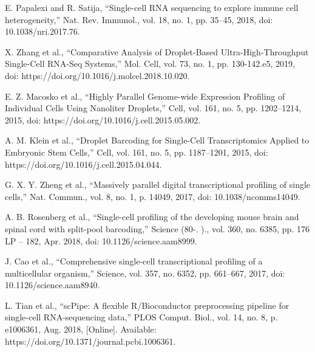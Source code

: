 \documentclass[10pt,journal,compsoc]{IEEEtran}
\begin{document}
%
%
\begin{thebibliography}{1}
	

%
%

E. Papalexi and R. Satija, “Single-cell RNA sequencing to explore immune cell heterogeneity,” Nat. Rev. Immunol., vol. 18, no. 1, pp. 35–45, 2018, doi: 10.1038/nri.2017.76.

X. Zhang et al., “Comparative Analysis of Droplet-Based Ultra-High-Throughput Single-Cell RNA-Seq Systems,” Mol. Cell, vol. 73, no. 1, pp. 130-142.e5, 2019, doi: https://doi.org/10.1016/j.molcel.2018.10.020.

E. Z. Macosko et al., “Highly Parallel Genome-wide Expression Profiling of Individual Cells Using Nanoliter Droplets,” Cell, vol. 161, no. 5, pp. 1202–1214, 2015, doi: https://doi.org/10.1016/j.cell.2015.05.002.

A. M. Klein et al., “Droplet Barcoding for Single-Cell Transcriptomics Applied to Embryonic Stem Cells,” Cell, vol. 161, no. 5, pp. 1187–1201, 2015, doi: https://doi.org/10.1016/j.cell.2015.04.044.

G. X. Y. Zheng et al., “Massively parallel digital transcriptional profiling of single cells,” Nat. Commun., vol. 8, no. 1, p. 14049, 2017, doi: 10.1038/ncomms14049.

A. B. Rosenberg et al., “Single-cell profiling of the developing mouse brain and spinal cord with split-pool barcoding,” Science (80-. )., vol. 360, no. 6385, pp. 176 LP – 182, Apr. 2018, doi: 10.1126/science.aam8999.

J. Cao et al., “Comprehensive single-cell transcriptional profiling of a multicellular organism,” Science, vol. 357, no. 6352, pp. 661–667, 2017, doi: 10.1126/science.aam8940.

L. Tian et al., “scPipe: A flexible R/Bioconductor preprocessing pipeline for single-cell RNA-sequencing data,” PLOS Comput. Biol., vol. 14, no. 8, p. e1006361, Aug. 2018, [Online]. Available: https://doi.org/10.1371/journal.pcbi.1006361.


\end{thebibliography}
\end{document}
